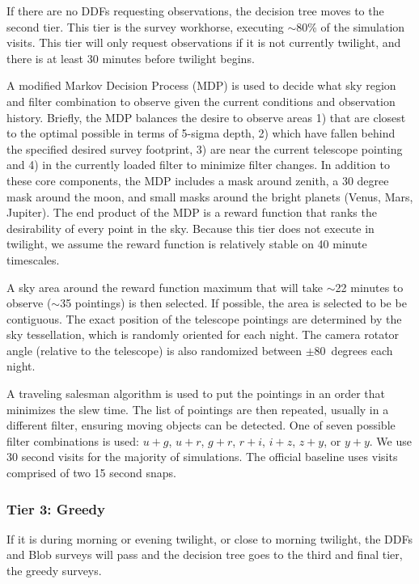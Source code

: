 If there are no DDFs requesting observations, the decision tree moves to the second tier. This tier is the survey workhorse, executing $\sim$80\% of the simulation visits.  This tier will only request observations if it is not currently twilight, and there is at least 30 minutes before twilight begins.

A modified Markov Decision Process (MDP) is used to decide what sky region and filter combination to observe given the current conditions and observation history. Briefly, the MDP balances the desire to observe areas 1) that are closest to the optimal possible in terms of 5-sigma depth, 2) which have fallen behind the specified desired survey footprint, 3) are near the current telescope pointing and 4) in the currently loaded filter to minimize filter changes.  In addition to these core components, the MDP includes a mask around zenith, a 30 degree mask around the moon, and small masks around the bright planets (Venus, Mars, Jupiter). The end product of the MDP is a reward function that ranks the desirability of every point in the sky. Because this tier does not execute in twilight, we assume the reward function is relatively stable on 40 minute timescales.

A sky area around the reward function maximum that will take $\sim$22 minutes to observe ($\sim$35 pointings) is then selected. If possible, the area is selected to be be contiguous.  The exact position of the telescope pointings are determined by the sky tessellation, which is randomly oriented for each night. The camera rotator angle (relative to the telescope) is also randomized between $\pm 80$\ degrees each night.

A traveling salesman algorithm is used to put the pointings in an order that minimizes the slew time. The list of pointings are then repeated, usually in a different filter, ensuring moving objects can be detected.  One of seven possible filter combinations is used: $u+g$, $u+r$, $g+r$, $r+i$, $i+z$, $z+y$, or $y+y$.  We use 30 second visits for the majority of simulations. The official baseline uses visits comprised of two 15 second snaps.  


\subsubsection{Tier 3:  Greedy}

If it is during morning or evening twilight, or close to morning twilight, the DDFs and Blob surveys will pass and the decision tree goes to the third and final tier, the greedy surveys. 

